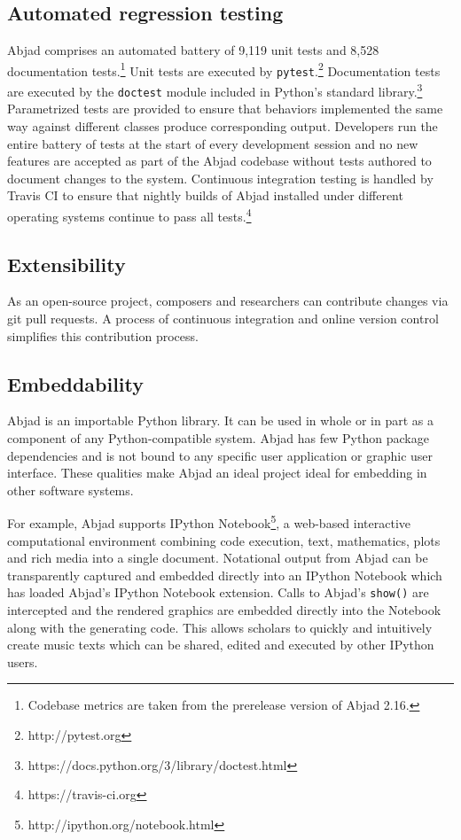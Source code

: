 \documentclass{article}
\begin{document}
\subsection{Automated regression testing}

Abjad comprises an automated battery of 9,119 unit tests and 8,528 documentation tests.\footnote{Codebase metrics are taken from the prerelease version of Abjad 2.16.} Unit tests are executed by \texttt{pytest}.\footnote{http://pytest.org} Documentation tests are executed by the \texttt{doctest} module included in Python's standard library.\footnote{https://docs.python.org/3/library/doctest.html} Parametrized tests are provided to ensure that behaviors implemented the same way against different classes produce corresponding output. Developers run the entire battery of tests at the start of every development session and no new features are accepted as part of the Abjad codebase without tests authored to document changes to the system. Continuous integration testing is handled by Travis CI to ensure that nightly builds of Abjad installed under different operating systems continue to pass all tests.\footnote{https://travis-ci.org}

\subsection{Extensibility}

As an open-source project, composers and researchers can contribute changes via
git pull requests. A process of continuous integration and online version
control simplifies this contribution process. 

\subsection{Embeddability}

Abjad is an importable Python library. It can be used in whole or in part as a
component of any Python-compatible system. Abjad has few Python package
dependencies and is not bound to any specific user application or graphic user
interface. These qualities make Abjad an ideal project ideal for embedding in
other software systems.

For example, Abjad supports IPython
Notebook\footnote{http://ipython.org/notebook.html}, a web-based interactive
computational environment combining code execution, text, mathematics, plots
and rich media into a single document. Notational output from Abjad can be
transparently captured and embedded directly into an IPython Notebook which has
loaded Abjad's IPython Notebook extension. Calls to Abjad's \texttt{show()} are
intercepted and the rendered graphics are embedded directly into the Notebook
along with the generating code. This allows scholars to quickly and intuitively
create music texts which can be shared, edited and executed by other IPython
users.
\end{document}
